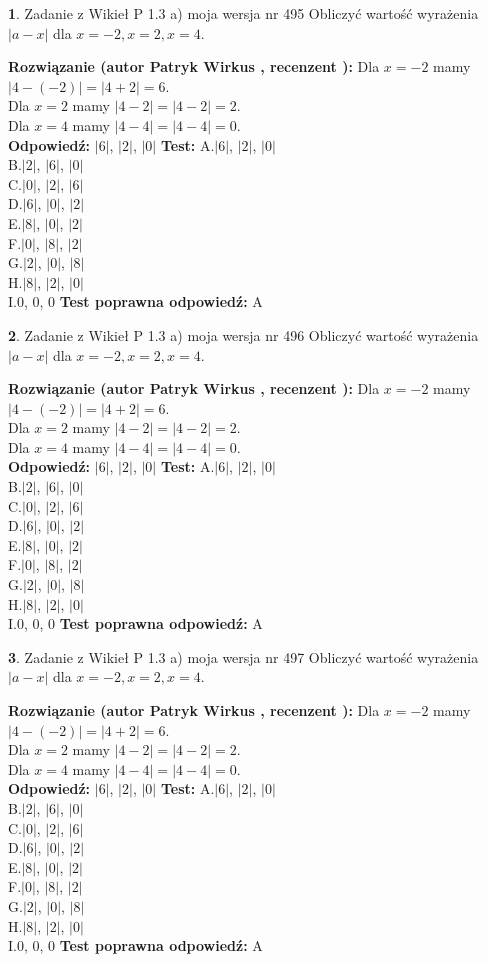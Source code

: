\documentclass[12pt, a4paper]{article}
\theoremstyle{definition} %
\newtheorem{zad}{}
\newcommand{\zadStart}[1]{\begin{zad}#1\newline}
\newcommand{\zadStop}{\end{zad}}
\newcommand{\rozwStart}[2]{\noindent \textbf{Rozwiązanie (autor #1 , recenzent #2): }\newline}
\newcommand{\rozwStop}{\newline}
\newcommand{\odpStart}{\noindent \textbf{Odpowiedź:}\newline}
\newcommand{\odpStop}{\newline}
\newcommand{\testStart}{\noindent \textbf{Test:}\newline}
\newcommand{\testStop}{\newline}
\newcommand{\kluczStart}{\noindent \textbf{Test poprawna odpowiedź:}\newline}
\newcommand{\kluczStop}{\newline}
\begin{document}
\zadStart{Zadanie z Wikieł P 1.3 a) moja wersja nr 495}
Obliczyć wartość wyrażenia $|a - x|$ dla $x=-2,x=2,x=4$.
\zadStop
\rozwStart{Patryk Wirkus}{}
Dla $x = -2$ mamy $|4 - (-2)| = |4 + 2| = 6$.\\
Dla $x = 2$ mamy $|4 - 2| = |4 - 2| = 2$.\\
Dla $x = 4$ mamy $|4 - 4| = |4 - 4| = 0$.\\
\rozwStop
\odpStart
$|6|$, $|2|$, $|0|$
\odpStop
\testStart
A.$|6|$, $|2|$, $|0|$\\
B.$|2|$, $|6|$, $|0|$\\
C.$|0|$, $|2|$, $|6|$\\
D.$|6|$, $|0|$, $|2|$\\
E.$|8|$, $|0|$, $|2|$\\
F.$|0|$, $|8|$, $|2|$\\
G.$|2|$, $|0|$, $|8|$\\
H.$|8|$, $|2|$, $|0|$\\
I.$0$, $0$, $0$
\testStop
\kluczStart
A
\kluczStop



\zadStart{Zadanie z Wikieł P 1.3 a) moja wersja nr 496}
Obliczyć wartość wyrażenia $|a - x|$ dla $x=-2,x=2,x=4$.
\zadStop
\rozwStart{Patryk Wirkus}{}
Dla $x = -2$ mamy $|4 - (-2)| = |4 + 2| = 6$.\\
Dla $x = 2$ mamy $|4 - 2| = |4 - 2| = 2$.\\
Dla $x = 4$ mamy $|4 - 4| = |4 - 4| = 0$.\\
\rozwStop
\odpStart
$|6|$, $|2|$, $|0|$
\odpStop
\testStart
A.$|6|$, $|2|$, $|0|$\\
B.$|2|$, $|6|$, $|0|$\\
C.$|0|$, $|2|$, $|6|$\\
D.$|6|$, $|0|$, $|2|$\\
E.$|8|$, $|0|$, $|2|$\\
F.$|0|$, $|8|$, $|2|$\\
G.$|2|$, $|0|$, $|8|$\\
H.$|8|$, $|2|$, $|0|$\\
I.$0$, $0$, $0$
\testStop
\kluczStart
A
\kluczStop



\zadStart{Zadanie z Wikieł P 1.3 a) moja wersja nr 497}
Obliczyć wartość wyrażenia $|a - x|$ dla $x=-2,x=2,x=4$.
\zadStop
\rozwStart{Patryk Wirkus}{}
Dla $x = -2$ mamy $|4 - (-2)| = |4 + 2| = 6$.\\
Dla $x = 2$ mamy $|4 - 2| = |4 - 2| = 2$.\\
Dla $x = 4$ mamy $|4 - 4| = |4 - 4| = 0$.\\
\rozwStop
\odpStart
$|6|$, $|2|$, $|0|$
\odpStop
\testStart
A.$|6|$, $|2|$, $|0|$\\
B.$|2|$, $|6|$, $|0|$\\
C.$|0|$, $|2|$, $|6|$\\
D.$|6|$, $|0|$, $|2|$\\
E.$|8|$, $|0|$, $|2|$\\
F.$|0|$, $|8|$, $|2|$\\
G.$|2|$, $|0|$, $|8|$\\
H.$|8|$, $|2|$, $|0|$\\
I.$0$, $0$, $0$
\testStop
\kluczStart
A
\kluczStop
\end{document}
